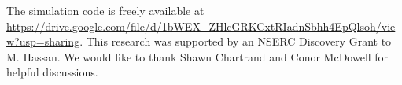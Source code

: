 \documentclass[draft]{agujournal2018}
\begin{document}
\acknowledgments
The simulation code is freely available at
\sloppy
\url{https://drive.google.com/file/d/1bWEX_ZHlcGRKCxtRIadnSbhh4EpQlsoh/view?usp=sharing}.
This research was supported by an NSERC Discovery Grant to M. Hassan.
We would like to thank Shawn Chartrand and Conor McDowell for helpful discussions.


\end{document}
